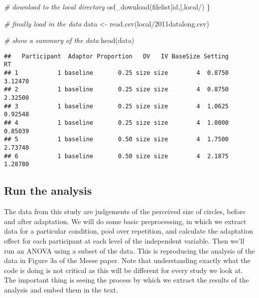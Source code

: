 \documentclass[
]{article}
\newenvironment{Shaded}{\begin{snugshade}}{\end{snugshade}}
\newcommand{\CommentTok}[1]{\textcolor[rgb]{0.56,0.35,0.01}{\textit{#1}}}
\newcommand{\FunctionTok}[1]{\textcolor[rgb]{0.00,0.00,0.00}{#1}}
\newcommand{\NormalTok}[1]{#1}
\newcommand{\OtherTok}[1]{\textcolor[rgb]{0.56,0.35,0.01}{#1}}
\newcommand{\StringTok}[1]{\textcolor[rgb]{0.31,0.60,0.02}{#1}}
\begin{document}
\begin{Shaded}
\begin{Highlighting}[]
\CommentTok{\# download to the local directory}
\FunctionTok{osf\_download}\NormalTok{(filelist[id,],}\StringTok{\textquotesingle{}local/\textquotesingle{}}\NormalTok{)}
\NormalTok{\}}

\CommentTok{\# finally load in the data}
\NormalTok{data }\OtherTok{\textless{}{-}} \FunctionTok{read.csv}\NormalTok{(}\StringTok{\textquotesingle{}local/2011datalong.csv\textquotesingle{}}\NormalTok{)}

\CommentTok{\# show a summary of the data}
\FunctionTok{head}\NormalTok{(data)}
\end{Highlighting}
\end{Shaded}

\begin{verbatim}
##   Participant  Adaptor Proportion   DV   IV BaseSize Setting      RT
## 1           1 baseline       0.25 size size        4  0.8750 3.12470
## 2           1 baseline       0.25 size size        4  0.8750 2.32500
## 3           1 baseline       0.25 size size        4  1.0625 0.92548
## 4           1 baseline       0.25 size size        4  1.0000 0.85039
## 5           1 baseline       0.50 size size        4  1.7500 2.73740
## 6           1 baseline       0.50 size size        4  2.1875 1.28780
\end{verbatim}

\hypertarget{run-the-analysis}{%
\subsection{Run the analysis}\label{run-the-analysis}}

The data from this study are judgements of the perceived size of circles, before and after adaptation. We will do some basic preprocessing, in which we extract data for a particular condition, pool over repetition, and calculate the adaptation effect for each participant at each level of the independent variable. Then we'll run an ANOVA using a subset of the data. This is reproducing the analysis of the data in Figure 3a of the Meese paper. Note that understanding exactly what the code is doing is not critical as this will be different for every study we look at. The important thing is seeing the process by which we extract the results of the analysis and embed them in the text.
\end{document}
